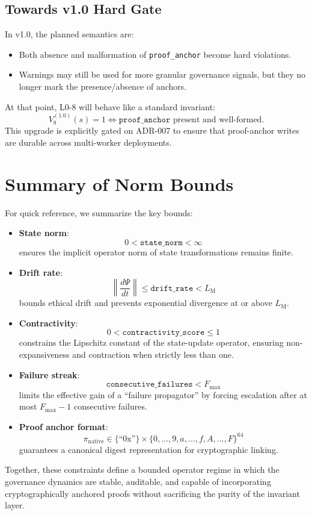 \documentclass[11pt]{article}
\begin{document}
\subsection{Towards v1.0 Hard Gate}

In v1.0, the planned semantics are:
\begin{itemize}
  \item Both absence and malformation of \texttt{proof\_anchor} become hard violations.
  \item Warnings may still be used for more granular governance signals, but they no longer mark the presence/absence of anchors.
\end{itemize}
At that point, L0-8 will behave like a standard invariant:
\[
  V_8^{(1.0)}(s) = 1 \iff \texttt{proof\_anchor} \text{ present and well-formed}.
\]
This upgrade is explicitly gated on ADR-007 to ensure that proof-anchor writes are durable across multi-worker deployments.\cite{cite:44,cite:46,cite:47}

\section{Summary of Norm Bounds}

For quick reference, we summarize the key bounds:

\begin{itemize}
  \item \textbf{State norm}:
  \[
    0 < \texttt{state\_norm} < \infty
  \]
  ensures the implicit operator norm of state transformations remains finite.\cite{cite:40,cite:42}
  \item \textbf{Drift rate}:
  \[
    \left\lVert \frac{d\Psi}{dt} \right\rVert \le \texttt{drift\_rate} < L_{\mathrm{M}}
  \]
  bounds ethical drift and prevents exponential divergence at or above \(L_{\mathrm{M}}\).\cite{cite:40,cite:42}
  \item \textbf{Contractivity}:
  \[
    0 < \texttt{contractivity\_score} \le 1
  \]
  constrains the Lipschitz constant of the state-update operator, ensuring non-expansiveness and contraction when strictly less than one.\cite{cite:40,cite:42}
  \item \textbf{Failure streak}:
  \[
    \texttt{consecutive\_failures} < F_{\max}
  \]
  limits the effective gain of a ``failure propagator'' by forcing escalation after at most \(F_{\max}-1\) consecutive failures.\cite{cite:40,cite:42}
  \item \textbf{Proof anchor format}:
  \[
    \pi_{\mathrm{native}} \in \{ \text{``0x''} \}\times\{0,\dots,9,a,\dots,f,A,\dots,F\}^{64}
  \]
  guarantees a canonical digest representation for cryptographic linking.\cite{cite:41,cite:43}
\end{itemize}

Together, these constraints define a bounded operator regime in which the governance dynamics are stable, auditable, and capable of incorporating cryptographically anchored proofs without sacrificing the purity of the invariant layer.

\nocite{*}
  

\end{document}
